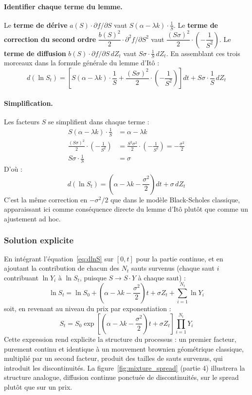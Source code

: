 \documentclass{article}
\begin{document}
\paragraph{Identifier chaque terme du lemme.} Le \textbf{terme de dérive} $a(S)\cdot\partial f/\partial S$ vaut $S(\alpha-\lambda k)\cdot\frac{1}{S}$.
Le \textbf{terme de correction du second ordre} $\dfrac{b(S)^2}{2}\cdot\partial^2 f/\partial S^2$ vaut $\dfrac{(S\sigma)^2}{2}\cdot\left(-\dfrac{1}{S^2}\right)$.
Le \textbf{terme de diffusion} $b(S)\cdot\partial f/\partial S\, dZ_t$ vaut $S\sigma\cdot\frac{1}{S}\, dZ_t$.
En assemblant ces trois morceaux dans la formule générale du lemme d'Itô :
\begin{equation}
d(\ln S_t) = \left[S(\alpha-\lambda k)\cdot\frac{1}{S} + \frac{(S\sigma)^2}{2}\cdot\left(-\frac{1}{S^2}\right)\right] dt + S\sigma \cdot \frac{1}{S}\, dZ_t
\end{equation}
\paragraph{Simplification.} Les facteurs $S$ se simplifient dans chaque terme :
\begin{align}
S(\alpha-\lambda k)\cdot\frac{1}{S} &= \alpha-\lambda k \\
\frac{(S\sigma)^2}{2}\cdot\left(-\frac{1}{S^2}\right) &= \frac{S^2\sigma^2}{2}\cdot\left(-\frac{1}{S^2}\right) = -\frac{\sigma^2}{2}  \\
S\sigma\cdot\frac{1}{S} &= \sigma
\end{align}
D'où :
\begin{equation}
d(\ln S_t) = \left(\alpha - \lambda k - \frac{\sigma^2}{2}\right) dt + \sigma\, dZ_t
\label{eq:dlnS}
\end{equation}
C'est la même correction en $-\sigma^2/2$ que dans le modèle Black-Scholes classique, apparaissant ici comme conséquence directe du lemme d'Itô plutôt que comme un ajustement ad hoc.
\subsubsection*{Solution explicite}
En intégrant l'équation~\eqref{eq:dlnS} sur $[0,t]$ pour la partie continue, et en ajoutant la contribution de chacun des $N_t$ sauts survenus (chaque saut $i$ contribuant $\ln Y_i$ à $\ln S_t$, puisque $S \to S\cdot Y$ à chaque saut) :
\begin{equation}
\ln S_t = \ln S_0 + \left(\alpha-\lambda k - \frac{\sigma^2}{2}\right) t + \sigma Z_t + \sum_{i=1}^{N_t} \ln Y_i
\end{equation}
soit, en revenant au niveau du prix par exponentiation :
\begin{equation}
S_t = S_0 \exp\left[\left(\alpha-\lambda k-\frac{\sigma^2}{2}\right)t + \sigma Z_t\right] \prod_{i=1}^{N_t} Y_i
\label{eq:solution}
\end{equation}
Cette expression rend explicite la structure du processus : un premier facteur, purement continu et identique à un mouvement brownien géométrique classique, multiplié par un second facteur, produit des tailles de sauts survenus, qui introduit les discontinuités. La figure~\ref{fig:mixture_spread} (partie 4) illustrera la structure analogue, diffusion continue ponctuée de discontinuités, sur le spread plutôt que sur un prix.
\end{document}
